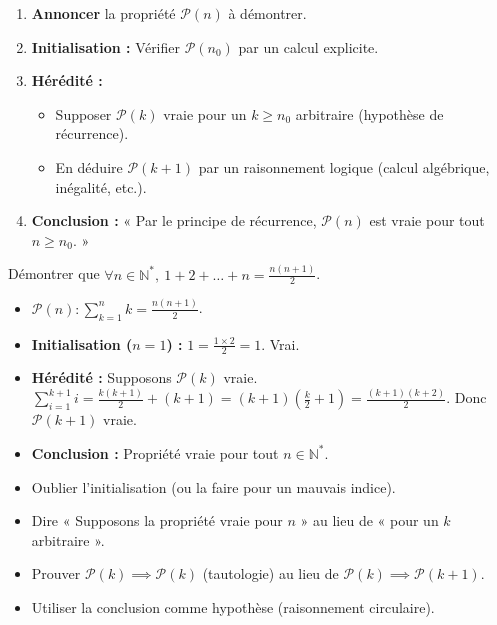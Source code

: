 \documentclass[11pt]{article}
\begin{document}
\begin{methode}
\begin{enumerate}
    \item \textbf{Annoncer} la propriété $\mathcal{P}(n)$ à démontrer.
    \item \textbf{Initialisation :} Vérifier $\mathcal{P}(n_0)$ par un calcul explicite.
    \item \textbf{Hérédité :}
    \begin{itemize}
        \item Supposer $\mathcal{P}(k)$ vraie pour un $k \ge n_0$ arbitraire (hypothèse de récurrence).
        \item En déduire $\mathcal{P}(k+1)$ par un raisonnement logique (calcul algébrique, inégalité, etc.).
    \end{itemize}
    \item \textbf{Conclusion :} « Par le principe de récurrence, $\mathcal{P}(n)$ est vraie pour tout $n \ge n_0$. »
\end{enumerate}
\end{methode}

\begin{exemplebox}
Démontrer que $\forall n \in \mathbb{N}^*,\ 1+2+\dots+n = \frac{n(n+1)}{2}$.
\begin{itemize}
    \item $\mathcal{P}(n) : \sum_{k=1}^n k = \frac{n(n+1)}{2}$.
    \item \textbf{Initialisation ($n=1$) :} $1 = \frac{1\times 2}{2} = 1$. Vrai.
    \item \textbf{Hérédité :} Supposons $\mathcal{P}(k)$ vraie. $\sum_{i=1}^{k+1} i = \frac{k(k+1)}{2} + (k+1) = (k+1)(\frac{k}{2}+1) = \frac{(k+1)(k+2)}{2}$. Donc $\mathcal{P}(k+1)$ vraie.
    \item \textbf{Conclusion :} Propriété vraie pour tout $n \in \mathbb{N}^*$.
\end{itemize}
\end{exemplebox}

\begin{attention}
\begin{itemize}
    \item Oublier l'initialisation (ou la faire pour un mauvais indice).
    \item Dire « Supposons la propriété vraie pour $n$ » au lieu de « pour un $k$ arbitraire ».
    \item Prouver $\mathcal{P}(k) \implies \mathcal{P}(k)$ (tautologie) au lieu de $\mathcal{P}(k) \implies \mathcal{P}(k+1)$.
    \item Utiliser la conclusion comme hypothèse (raisonnement circulaire).
\end{itemize}
\end{attention}
\end{document}
